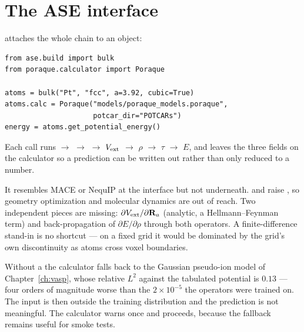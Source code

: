 \section{The ASE interface}

 attaches the whole chain to an
 object:

\begin{lstlisting}
from ase.build import bulk
from poraque.calculator import Poraque

atoms = bulk("Pt", "fcc", a=3.92, cubic=True)
atoms.calc = Poraque("models/poraque_models.poraque",
                     potcar_dir="POTCARs")
energy = atoms.get_potential_energy()
\end{lstlisting}

Each call runs  $\to$  $\to$  $\to$
$V_{\mathrm{ext}}$ $\to$ $\rho$ $\to$ $\tau$ $\to$ $E$, and leaves the three fields on the
calculator so a prediction can be written out rather than only reduced to a
number.

It resembles MACE or NequIP at the interface but not underneath.
 and  raise , so
geometry optimization and molecular dynamics are out of reach. Two independent
pieces are missing: $\partial V_{\mathrm{ext}}/\partial\mathbf{R}_a$ (analytic, a
Hellmann--Feynman term) and back-propagation of $\partial E/\partial\rho$
through both operators. A finite-difference stand-in is no shortcut --- on a
fixed grid it would be dominated by the grid's own discontinuity as atoms cross
voxel boundaries.

\begin{pwarn}
Without a  the calculator falls back to the Gaussian pseudo-ion
model of Chapter~\ref{ch:vasp}, whose relative $L^{2}$ against the tabulated
potential is $0.13$ --- four orders of magnitude worse than the
$2\times10^{-5}$ the operators were trained on. The input is then outside the
training distribution and the prediction is not meaningful. The calculator
warns once and proceeds, because the fallback remains useful for smoke tests.
\end{pwarn}
